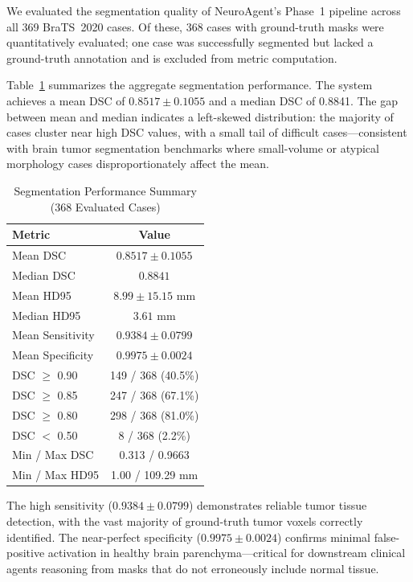 \documentclass[journal]{IEEEtran}
\begin{document}
We evaluated the segmentation quality of NeuroAgent's Phase~1 pipeline
across all 369 BraTS~2020 cases. Of these, 368 cases with ground-truth
masks were quantitatively evaluated; one case was successfully segmented
but lacked a ground-truth annotation and is excluded from metric
computation.

Table~\ref{tab:seg} summarizes the aggregate segmentation performance. The
system achieves a mean DSC of $0.8517 \pm 0.1055$ and a median DSC of
0.8841. The gap between mean and median indicates a left-skewed
distribution: the majority of cases cluster near high DSC values, with a
small tail of difficult cases---consistent with brain tumor segmentation
benchmarks where small-volume or atypical morphology cases
disproportionately affect the mean.

\begin{table}[h]
\centering
\caption{Segmentation Performance Summary (368 Evaluated Cases)}
\label{tab:seg}
\begin{tabular}{lc}
\toprule
\textbf{Metric} & \textbf{Value} \\
\midrule
Mean DSC              & $0.8517 \pm 0.1055$ \\
Median DSC            & $0.8841$ \\
Mean HD95             & $8.99 \pm 15.15$ mm \\
Median HD95           & $3.61$ mm \\
Mean Sensitivity      & $0.9384 \pm 0.0799$ \\
Mean Specificity      & $0.9975 \pm 0.0024$ \\
DSC $\geq$ 0.90       & 149 / 368 (40.5\%) \\
DSC $\geq$ 0.85       & 247 / 368 (67.1\%) \\
DSC $\geq$ 0.80       & 298 / 368 (81.0\%) \\
DSC $<$ 0.50          & 8 / 368 (2.2\%) \\
Min / Max DSC         & 0.313 / 0.9663 \\
Min / Max HD95        & 1.00 / 109.29 mm \\
\bottomrule
\end{tabular}
\end{table}

The high sensitivity ($0.9384 \pm 0.0799$) demonstrates reliable tumor
tissue detection, with the vast majority of ground-truth tumor voxels
correctly identified. The near-perfect specificity ($0.9975 \pm 0.0024$)
confirms minimal false-positive activation in healthy brain
parenchyma---critical for downstream clinical agents reasoning from masks
that do not erroneously include normal tissue.
\end{document}
